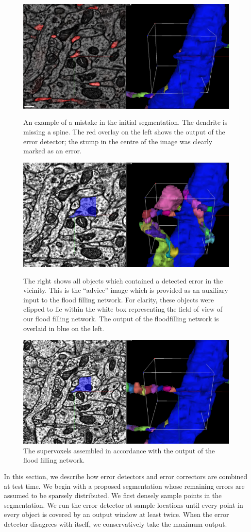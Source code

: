 \documentclass{article}
\begin{document}
\begin{figure}
\begin{center}
	\includegraphics[width=0.65\linewidth]{errors.jpg}
	\caption{An example of a mistake in the initial segmentation. The dendrite is missing a spine. The red overlay on the left shows the output of the error detector; the stump in the centre of the image was clearly marked as an error.}

	\includegraphics[width=0.65\linewidth]{neighbours.jpg}
	\caption{The right shows all objects which contained  a detected error in the vicinity. This is the ``advice'' image which is provided as an auxiliary input to the flood filling network. For clarity, these objects were clipped to lie within the white box representing the field of view of our flood filling network. The output of the floodfilling network is overlaid in blue on the left.}

	\includegraphics[width=0.65\linewidth]{final.jpg}
	\caption{The supervoxels assembled in accordance with the output of the flood filling network.}
\end{center}
\end{figure}
In this section, we describe how error detectors and error correctors are combined at test time. We begin with a proposed segmentation whose remaining errors are assumed to be sparsely distributed. We first densely sample points in the segmentation. We run the error detector at sample locations until every point in every object is covered by an output window at least twice. When the error detector disagrees with itself, we conservatively take the maximum output.
\end{document}
